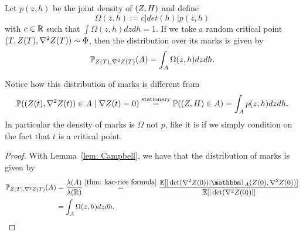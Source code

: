 \begin{corollary}
	Let \(p(z,h)\) be the joint density of \((Z, H)\) and define
	\[
		\Omega(z,h) := c |det(h)| p(z,h)
	\]
	with \(c\in\mathbb{R}\) such that \(\int \Omega(z,h)dz dh = 1\).
	If we take a random critical point \((T,Z(T),\nabla^2Z(T))\sim \Phi\),
	then the distribution over its marks is given by
	\[
		\mathbb{P}_{Z(T),\nabla^2Z(T)}(A) = \int_A \Omega(z,h) dz dh.
	\]
\end{corollary}
\begin{remark}
	Notice how this distribution of marks is different from
	\[
		\mathbb{P}((Z(t),\nabla^2Z(t))\in A \mid \nabla Z(t) = 0)
		\overset{\text{stationary}}
		= \mathbb{P}((Z,H)\in A)
		= \int_A p(z,h)dz dh.
	\]
	In particular the density of marks is \(\Omega\) not \(p\), like it is if
	we simply condition on the fact that \(t\) is a critical point.
\end{remark}
\begin{proof}
	With Lemma~\ref{lem: Campbell}, we have that the distribution of marks is
	given by
	\begin{align*}
		\Pr_{\rf(T),\nabla^2\rf(T)}(A)
		&= \frac{\lambda(A)}{\lambda(\real)}
		\overset{\ref{thm: kac-rice formula}}= \frac{
			\E[|\det(\nabla^2 \rf(0))|
			\ind_A(\rf(0), \nabla^2\rf(0))
			]
		}{
			\E[|\det(\nabla^2 \rf(0))|]
		}\\
		&= \int_A \Omega(z,h) dz dh.
		\qedhere
	\end{align*}
\end{proof}

